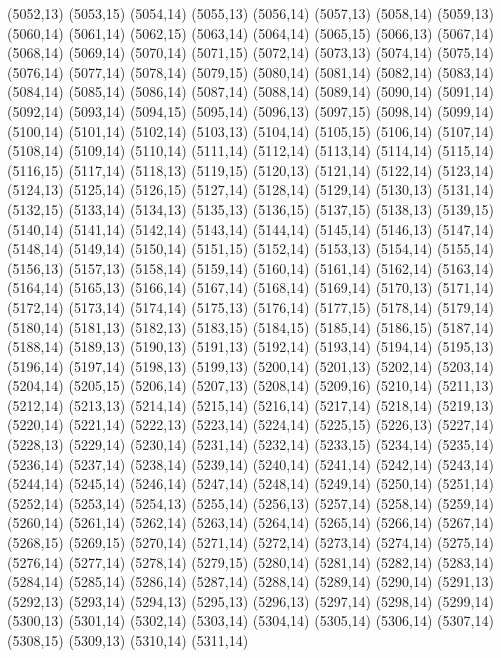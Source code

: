 (5052,13)
(5053,15)
(5054,14)
(5055,13)
(5056,14)
(5057,13)
(5058,14)
(5059,13)
(5060,14)
(5061,14)
(5062,15)
(5063,14)
(5064,14)
(5065,15)
(5066,13)
(5067,14)
(5068,14)
(5069,14)
(5070,14)
(5071,15)
(5072,14)
(5073,13)
(5074,14)
(5075,14)
(5076,14)
(5077,14)
(5078,14)
(5079,15)
(5080,14)
(5081,14)
(5082,14)
(5083,14)
(5084,14)
(5085,14)
(5086,14)
(5087,14)
(5088,14)
(5089,14)
(5090,14)
(5091,14)
(5092,14)
(5093,14)
(5094,15)
(5095,14)
(5096,13)
(5097,15)
(5098,14)
(5099,14)
(5100,14)
(5101,14)
(5102,14)
(5103,13)
(5104,14)
(5105,15)
(5106,14)
(5107,14)
(5108,14)
(5109,14)
(5110,14)
(5111,14)
(5112,14)
(5113,14)
(5114,14)
(5115,14)
(5116,15)
(5117,14)
(5118,13)
(5119,15)
(5120,13)
(5121,14)
(5122,14)
(5123,14)
(5124,13)
(5125,14)
(5126,15)
(5127,14)
(5128,14)
(5129,14)
(5130,13)
(5131,14)
(5132,15)
(5133,14)
(5134,13)
(5135,13)
(5136,15)
(5137,15)
(5138,13)
(5139,15)
(5140,14)
(5141,14)
(5142,14)
(5143,14)
(5144,14)
(5145,14)
(5146,13)
(5147,14)
(5148,14)
(5149,14)
(5150,14)
(5151,15)
(5152,14)
(5153,13)
(5154,14)
(5155,14)
(5156,13)
(5157,13)
(5158,14)
(5159,14)
(5160,14)
(5161,14)
(5162,14)
(5163,14)
(5164,14)
(5165,13)
(5166,14)
(5167,14)
(5168,14)
(5169,14)
(5170,13)
(5171,14)
(5172,14)
(5173,14)
(5174,14)
(5175,13)
(5176,14)
(5177,15)
(5178,14)
(5179,14)
(5180,14)
(5181,13)
(5182,13)
(5183,15)
(5184,15)
(5185,14)
(5186,15)
(5187,14)
(5188,14)
(5189,13)
(5190,13)
(5191,13)
(5192,14)
(5193,14)
(5194,14)
(5195,13)
(5196,14)
(5197,14)
(5198,13)
(5199,13)
(5200,14)
(5201,13)
(5202,14)
(5203,14)
(5204,14)
(5205,15)
(5206,14)
(5207,13)
(5208,14)
(5209,16)
(5210,14)
(5211,13)
(5212,14)
(5213,13)
(5214,14)
(5215,14)
(5216,14)
(5217,14)
(5218,14)
(5219,13)
(5220,14)
(5221,14)
(5222,13)
(5223,14)
(5224,14)
(5225,15)
(5226,13)
(5227,14)
(5228,13)
(5229,14)
(5230,14)
(5231,14)
(5232,14)
(5233,15)
(5234,14)
(5235,14)
(5236,14)
(5237,14)
(5238,14)
(5239,14)
(5240,14)
(5241,14)
(5242,14)
(5243,14)
(5244,14)
(5245,14)
(5246,14)
(5247,14)
(5248,14)
(5249,14)
(5250,14)
(5251,14)
(5252,14)
(5253,14)
(5254,13)
(5255,14)
(5256,13)
(5257,14)
(5258,14)
(5259,14)
(5260,14)
(5261,14)
(5262,14)
(5263,14)
(5264,14)
(5265,14)
(5266,14)
(5267,14)
(5268,15)
(5269,15)
(5270,14)
(5271,14)
(5272,14)
(5273,14)
(5274,14)
(5275,14)
(5276,14)
(5277,14)
(5278,14)
(5279,15)
(5280,14)
(5281,14)
(5282,14)
(5283,14)
(5284,14)
(5285,14)
(5286,14)
(5287,14)
(5288,14)
(5289,14)
(5290,14)
(5291,13)
(5292,13)
(5293,14)
(5294,13)
(5295,13)
(5296,13)
(5297,14)
(5298,14)
(5299,14)
(5300,13)
(5301,14)
(5302,14)
(5303,14)
(5304,14)
(5305,14)
(5306,14)
(5307,14)
(5308,15)
(5309,13)
(5310,14)
(5311,14)
